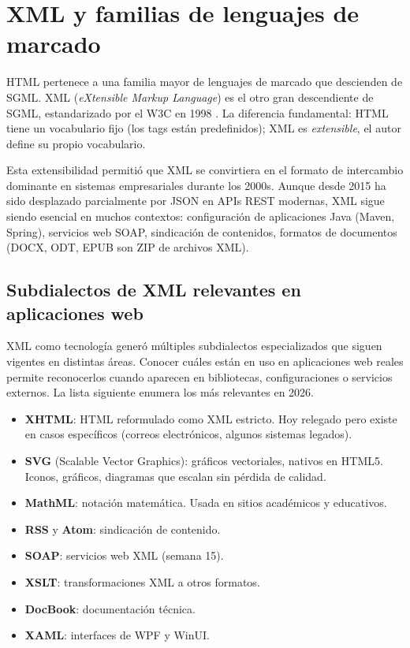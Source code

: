 \documentclass[11pt,a4paper,openany]{book}
\begin{document}
\section{XML y familias de lenguajes de marcado}

HTML pertenece a una familia mayor de lenguajes de marcado que
descienden de SGML. XML (\emph{eXtensible Markup Language}) es el
otro gran descendiente de SGML, estandarizado por el W3C en 1998
\cite{w3c1998xml}. La diferencia fundamental: HTML tiene un
vocabulario fijo (los tags están predefinidos); XML es
\emph{extensible}, el autor define su propio vocabulario.

Esta extensibilidad permitió que XML se convirtiera en el formato
de intercambio dominante en sistemas empresariales durante los
2000s. Aunque desde 2015 ha sido desplazado parcialmente por JSON
en APIs REST modernas, XML sigue siendo esencial en muchos
contextos: configuración de aplicaciones Java (Maven, Spring),
servicios web SOAP, sindicación de contenidos, formatos de
documentos (DOCX, ODT, EPUB son ZIP de archivos XML).

\subsection{Subdialectos de XML relevantes en aplicaciones web}

XML como tecnología generó múltiples subdialectos
especializados que siguen vigentes en distintas áreas. Conocer cuáles
están en uso en aplicaciones web reales permite reconocerlos cuando
aparecen en bibliotecas, configuraciones o servicios externos. La
lista siguiente enumera los más relevantes en 2026.


\begin{itemize}
\item \textbf{XHTML}: HTML reformulado como XML estricto. Hoy
relegado pero existe en casos específicos (correos electrónicos,
algunos sistemas legados).
\item \textbf{SVG} (Scalable Vector Graphics): gráficos vectoriales,
nativos en HTML5. Iconos, gráficos, diagramas que escalan sin
pérdida de calidad.
\item \textbf{MathML}: notación matemática. Usada en sitios
académicos y educativos.
\item \textbf{RSS} y \textbf{Atom}: sindicación de contenido.
\item \textbf{SOAP}: servicios web XML (semana 15).
\item \textbf{XSLT}: transformaciones XML a otros formatos.
\item \textbf{DocBook}: documentación técnica.
\item \textbf{XAML}: interfaces de WPF y WinUI.
\end{itemize}
\end{document}
